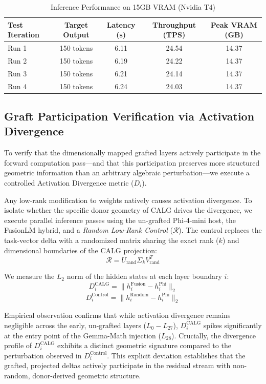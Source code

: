 \documentclass[11pt]{article}
\begin{document}
\begin{table}[h]
\centering
\caption{Inference Performance on 15GB VRAM (Nvidia T4)}
\label{tab:perf}
\vspace{0.2cm}
\begin{tabular}{@{}lcccc@{}}
\toprule
\textbf{Test Iteration} & \textbf{Target Output} & \textbf{Latency (s)} & \textbf{Throughput (TPS)} & \textbf{Peak VRAM (GB)} \\ \midrule
Run 1 & 150 tokens & 6.11 & 24.54 & 14.37 \\
Run 2 & 150 tokens & 6.19 & 24.22 & 14.37 \\
Run 3 & 150 tokens & 6.21 & 24.14 & 14.37 \\
Run 4 & 150 tokens & 6.24 & 24.03 & 14.37 \\ \bottomrule
\end{tabular}
\end{table}

\subsection{Graft Participation Verification via Activation Divergence}
To verify that the dimensionally mapped grafted layers actively participate in the forward computation pass—and that this participation preserves more structured geometric information than an arbitrary algebraic perturbation—we execute a controlled Activation Divergence metric ($D_i$).

Any low-rank modification to weights natively causes activation divergence. To isolate whether the specific donor geometry of CALG drives the divergence, we execute parallel inference passes using the un-grafted Phi-4-mini host, the FusionLM hybrid, and a \textit{Random Low-Rank Control} ($\mathcal{R}$). The control replaces the task-vector delta with a randomized matrix sharing the exact rank ($k$) and dimensional boundaries of the CALG projection:
$$ \mathcal{R} = U_{\text{rand}} \Sigma_k V_{\text{rand}}^T $$

We measure the $L_2$ norm of the hidden states at each layer boundary $i$:
$$ D_i^{\text{CALG}} = \|h_i^{\text{Fusion}} - h_i^{\text{Phi}}\|_2 $$
$$ D_i^{\text{Control}} = \|h_i^{\text{Random}} - h_i^{\text{Phi}}\|_2 $$

Empirical observation confirms that while activation divergence remains negligible across the early, un-grafted layers ($L_0 - L_{27}$), $D_i^{\text{CALG}}$ spikes significantly at the entry point of the Gemma-Math injection ($L_{28}$). Crucially, the divergence profile of $D_i^{\text{CALG}}$ exhibits a distinct geometric signature compared to the perturbation observed in $D_i^{\text{Control}}$. This explicit deviation establishes that the grafted, projected deltas actively participate in the residual stream with non-random, donor-derived geometric structure.
\end{document}
